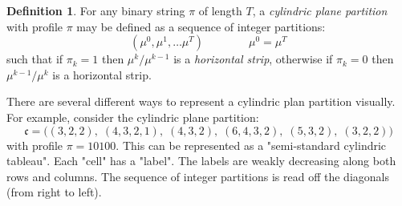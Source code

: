 \documentclass[11pt]{article}
\theoremstyle{plain}
\theoremstyle{definition}
\newtheorem{definition}[theorem]{Definition}
\begin{document}
\begin{definition} \label{cylindric-def}
For any binary string $\pi$ of length $T$,
a \emph{cylindric plane partition} with profile $\pi$ may be defined as a sequence of integer partitions:
\begin{equation}
(\mu^0, \mu^1, \ldots \mu^T) \qquad \qquad \mu^0 = \mu^T
\end{equation}
such that if $\pi_k = 1$ then $\mu^k / \mu^{k-1}$ is a \emph{horizontal strip}, otherwise if $\pi_k = 0$ then $\mu^{k-1} / \mu^k$ is a horizontal strip.
\end{definition}

There are several different ways to represent a cylindric plan partition visually. For example, consider the cylindric plane partition:
  \[ \mathfrak{c} = \bigl((3,2,2),\;(4,3,2,1),\;(4,3,2),\;(6,4,3,2),\;(5,3,2),\;(3,2,2)\bigr)\]
  with profile $\pi = 10100$. This can be represented as a "semi-standard cylindric tableau". Each "cell" has a "label". The labels are weakly decreasing along both rows and columns. The sequence of integer partitions is read off the diagonals (from right to left).
  
  

  \bigskip
\begin{center}
\end{center}
\end{document}
